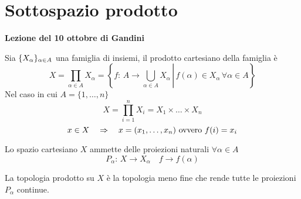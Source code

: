 

\section{Sottospazio prodotto}
\textbf{Lezione del 10 ottobre di Gandini}
\begin{defn}\bianco
Sia $ \displaystyle \{X_\alpha\}_{\alpha\in A}$ una famiglia di insiemi, il prodotto cartesiano della famiglia \`e 
$$ X=\prod_{\alpha\in A} X_\alpha = \left. \left\{ f:\, A \to \bigcup_{\alpha\in A} X_\alpha \, \right\vert \,  f(\alpha) \in X_\alpha \, \forall \alpha\in A  \right\}$$
Nel caso in cui $A=\{ 1, \dots , n \}$ 
$$ X = \prod_{i=1}^n X_i = X_1 \times \dots \times X_n$$
$$ x\in X \quad \Rightarrow \quad x= (x_1, \dots , x_n ) \text{ ovvero } f(i)=x_i$$
\end{defn}
\begin{defn}[Proiezioni]Lo spazio cartesiano $X$ ammette delle proiezioni naturali $\forall \alpha \in A $
$$ P_\alpha:\, X \to X_\alpha \quad f \to f(\alpha) $$
\end{defn}
\spazio
\begin{defn}La topologia prodotto su $X$ \`e la topologia meno fine  che rende  tutte le proiezioni $P_\alpha$ continue.
\end{defn}
